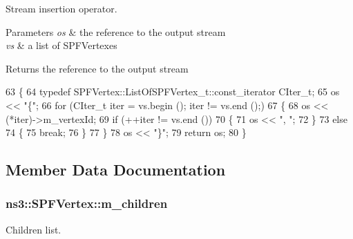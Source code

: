 Stream insertion operator. 


\begin{DoxyParams}{Parameters}
{\em os} & the reference to the output stream \\
\hline
{\em vs} & a list of S\+P\+F\+Vertexes \\
\hline
\end{DoxyParams}
\begin{DoxyReturn}{Returns}
the reference to the output stream 
\end{DoxyReturn}

\begin{DoxyCode}
63 \{
64   \textcolor{keyword}{typedef} SPFVertex::ListOfSPFVertex\_t::const\_iterator CIter\_t;
65   os << \textcolor{stringliteral}{"\{"};
66   \textcolor{keywordflow}{for} (CIter\_t iter = vs.begin (); iter != vs.end ();)
67     \{
68       os << (*iter)->m\_vertexId;
69       \textcolor{keywordflow}{if} (++iter != vs.end ()) 
70         \{
71           os << \textcolor{stringliteral}{", "};
72         \}
73       \textcolor{keywordflow}{else} 
74         \{ 
75           \textcolor{keywordflow}{break};
76         \}
77     \}
78   os << \textcolor{stringliteral}{"\}"};
79   \textcolor{keywordflow}{return} os;
80 \}
\end{DoxyCode}


\subsection{Member Data Documentation}
\subsubsection[{\texorpdfstring{m\+\_\+children}{m_children}}]{ ns3\+::\+S\+P\+F\+Vertex\+::m\+\_\+children\hspace{0.3cm}{\ttfamily [private]}}\hypertarget{classns3_1_1SPFVertex_af075e299721e613e5514392c3b3122c4}{}\label{classns3_1_1SPFVertex_af075e299721e613e5514392c3b3122c4}


Children list. 

